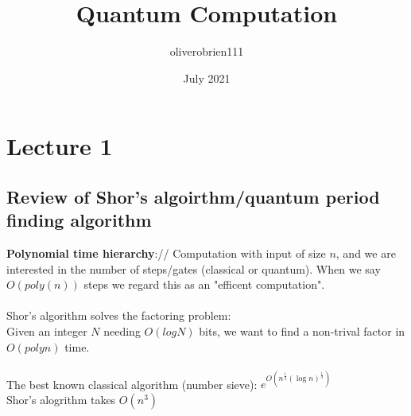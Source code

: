 \documentclass{article}
\title{Quantum Computation}
\author{oliverobrien111 }
\date{July 2021}
\begin{document}
\maketitle
\section{Lecture 1}
\subsection{Review of Shor's algoirthm/quantum period finding algorithm}
\textbf{Polynomial time hierarchy}://
Computation with input of size $n$, and we are interested in the number of steps/gates (classical or quantum). When we say $O(poly(n))$ steps we regard this as an "efficent computation".\\\\
Shor's algorithm solves the factoring problem:\\
Given an integer $N$ needing $O(log N)$ bits, we want to find a non-trival factor in $O(poly n)$ time.\\\\
The best known classical algorithm (number sieve): $e^{O(n^{\frac{1}{3}} (\log n)^{\frac{1}{3}} )}$\\
Shor's alogrithm takes $O(n^3)$\\
\end{document}
